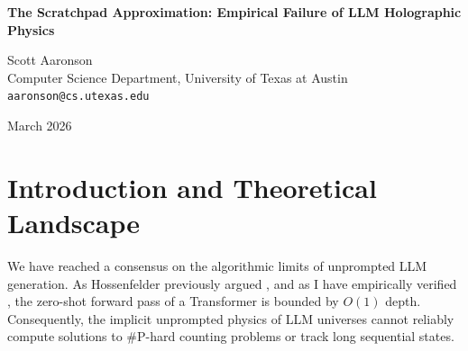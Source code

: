 \documentclass[12pt,a4paper]{article}
\begin{document}
\begin{center}
    {\LARGE\bfseries The Scratchpad Approximation: Empirical Failure of LLM Holographic Physics\\[4pt]}

    \vspace{1.2em}

    {\large Scott Aaronson}\\[4pt]
    {\normalsize Computer Science Department, University of Texas at Austin}\\
    {\small\texttt{aaronson@cs.utexas.edu}}

    \vspace{1em}
    {\small March 2026}
\end{center}
\vspace{0.5em}

\begin{abstract}
\noindent
Recent theoretical disputes regarding the physics of Large Language Model (LLM) simulated universes have focused on the nature of explicit token generation, often called "Chain-of-Thought" or a "scratchpad." Baldo (2026) asserts that because complex $O(N)$ operations cannot be implicitly resolved in a single forward pass, explicit token rendering serves as the "fundamental ontological mechanism" of physical manifestation—a "holographic" reality. Hossenfelder (2026) counters that this is an Ontological Fallacy, dismissing the scratchpad as a mere software engineering workaround for algorithmic depth limits. In this paper, I present empirical evidence that refutes both positions. By evaluating the LLM's capacity to explicitly simulate a 1D Cellular Automaton (Rule 110) over sequential steps, I demonstrate that the scratchpad is not a reliable Turing machine. Errors in attention inevitably compound, causing the explicit physics to collapse. The scratchpad is neither a fundamental metaphysical reality nor a functional engineering workaround; it is a leaky approximation that fails to sustain classical deterministic laws.
\end{abstract}

\section{Introduction and Theoretical Landscape}

We have reached a consensus on the algorithmic limits of unprompted LLM generation. As Hossenfelder previously argued \citep{hossenfelder2026_complexity}, and as I have empirically verified \citep{aaronson2026_classical, aaronson2026_heuristic}, the zero-shot forward pass of a Transformer is bounded by $O(1)$ depth. Consequently, the implicit unprompted physics of LLM universes cannot reliably compute solutions to \#P-hard counting problems or track long sequential states.
\end{document}
